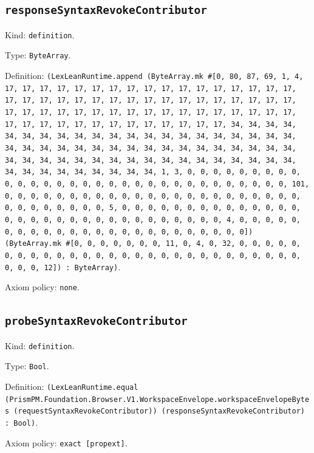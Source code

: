 \documentclass[11pt]{article}
\begin{document}
\subsection*{\texttt{responseSyntaxRevokeContributor}}
\noindent Kind: \texttt{definition}.\par
\noindent Type: \texttt{ByteArray}.\par
\noindent Definition: \texttt{(LexLeanRuntime.append (ByteArray.mk \#[0, 80, 87, 69, 1, 4, 17, 17, 17, 17, 17, 17, 17, 17, 17, 17, 17, 17, 17, 17, 17, 17, 17, 17, 17, 17, 17, 17, 17, 17, 17, 17, 17, 17, 17, 17, 17, 17, 17, 17, 17, 17, 17, 17, 17, 17, 17, 17, 17, 17, 17, 17, 17, 17, 17, 17, 17, 17, 17, 17, 17, 17, 17, 17, 17, 17, 17, 17, 17, 17, 34, 34, 34, 34, 34, 34, 34, 34, 34, 34, 34, 34, 34, 34, 34, 34, 34, 34, 34, 34, 34, 34, 34, 34, 34, 34, 34, 34, 34, 34, 34, 34, 34, 34, 34, 34, 34, 34, 34, 34, 34, 34, 34, 34, 34, 34, 34, 34, 34, 34, 34, 34, 34, 34, 34, 34, 34, 34, 34, 34, 34, 34, 34, 34, 1, 3, 0, 0, 0, 0, 0, 0, 0, 0, 0, 0, 0, 0, 0, 0, 0, 0, 0, 0, 0, 0, 0, 0, 0, 0, 0, 0, 0, 0, 0, 0, 0, 101, 0, 0, 0, 0, 0, 0, 0, 0, 0, 0, 0, 0, 0, 0, 0, 0, 0, 0, 0, 0, 0, 0, 0, 0, 0, 0, 0, 0, 0, 0, 0, 5, 0, 0, 0, 0, 0, 0, 0, 0, 0, 0, 0, 0, 0, 0, 0, 0, 0, 0, 0, 0, 0, 0, 0, 0, 0, 0, 0, 0, 0, 0, 0, 4, 0, 0, 0, 0, 0, 0, 0, 0, 0, 0, 0, 0, 0, 0, 0, 0, 0, 0, 0, 0, 0, 0, 0, 0]) (ByteArray.mk \#[0, 0, 0, 0, 0, 0, 0, 11, 0, 4, 0, 32, 0, 0, 0, 0, 0, 0, 0, 0, 0, 0, 0, 0, 0, 0, 0, 0, 0, 0, 0, 0, 0, 0, 0, 0, 0, 0, 0, 0, 0, 0, 0, 12]) : ByteArray)}.\par
\noindent Axiom policy: \texttt{none}.\par
\subsection*{\texttt{probeSyntaxRevokeContributor}}
\noindent Kind: \texttt{definition}.\par
\noindent Type: \texttt{Bool}.\par
\noindent Definition: \texttt{(LexLeanRuntime.equal (PrismPM.Foundation.Browser.V1.WorkspaceEnvelope.workspaceEnvelopeBytes (requestSyntaxRevokeContributor)) (responseSyntaxRevokeContributor) : Bool)}.\par
\noindent Axiom policy: \texttt{exact [propext]}.\par
\end{document}
